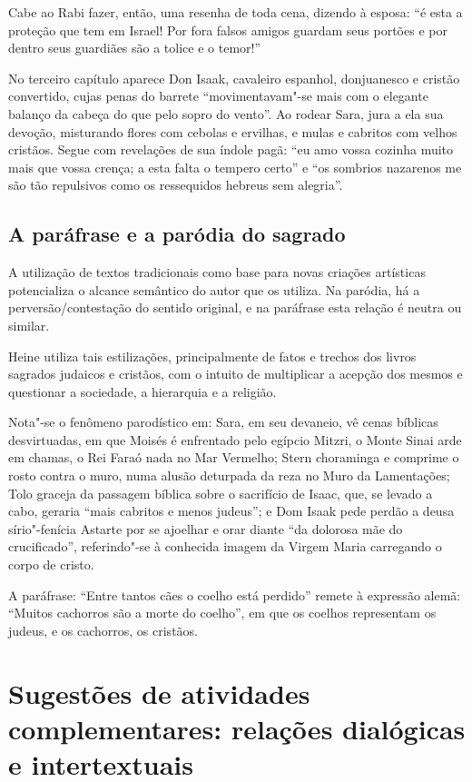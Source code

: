 \documentclass[12pt]{extarticle}
\begin{document}
Cabe ao Rabi fazer, então, uma resenha de toda cena, dizendo à esposa:
``é esta a proteção que tem em Israel! Por fora falsos amigos guardam
seus portões e por dentro seus guardiães são a tolice e o temor!''

No terceiro capítulo aparece Don Isaak, cavaleiro espanhol, donjuanesco
e cristão convertido, cujas penas do barrete ``movimentavam"-se mais com
o elegante balanço da cabeça do que pelo sopro do vento''. Ao rodear
Sara, jura a ela sua devoção, misturando flores com cebolas e ervilhas,
e mulas e cabritos com velhos cristãos. Segue com revelações de sua
índole pagã: ``eu amo vossa cozinha muito mais que vossa crença; a esta
falta o tempero certo'' e ``os sombrios nazarenos me são tão repulsivos
como os ressequidos hebreus sem alegria''.

\subsection{A paráfrase e a paródia do sagrado}

A utilização de textos tradicionais como base para novas criações
artísticas potencializa o alcance semântico do autor que os utiliza. Na
paródia, há a perversão/contestação do sentido original, e na paráfrase
esta relação é neutra ou similar.

Heine utiliza tais estilizações, principalmente de fatos e trechos dos
livros sagrados judaicos e cristãos, com o intuito de multiplicar a
acepção dos mesmos e questionar a sociedade, a hierarquia e a religião.

Nota"-se o fenômeno parodístico em: Sara, em seu devaneio, vê cenas
bíblicas desvirtuadas, em que Moisés é enfrentado pelo egípcio Mitzri, o
Monte Sinai arde em chamas, o Rei Faraó nada no Mar Vermelho; Stern
choraminga e comprime o rosto contra o muro, numa alusão deturpada da
reza no Muro da Lamentações; Tolo graceja da passagem bíblica sobre o
sacrifício de Isaac, que, se levado a cabo, geraria ``mais cabritos e
menos judeus''; e Dom Isaak pede perdão a deusa sírio"-fenícia Astarte
por se ajoelhar e orar diante ``da dolorosa mãe do crucificado'',
referindo"-se à conhecida imagem da Virgem Maria carregando o corpo de
cristo.

A paráfrase: ``Entre tantos cães o coelho está perdido'' remete à
expressão alemã: ``Muitos cachorros são a morte do coelho'', em que os
coelhos representam os judeus, e os cachorros, os cristãos.

\section{Sugestões de atividades complementares: relações dialógicas e
intertextuais}
\end{document}
